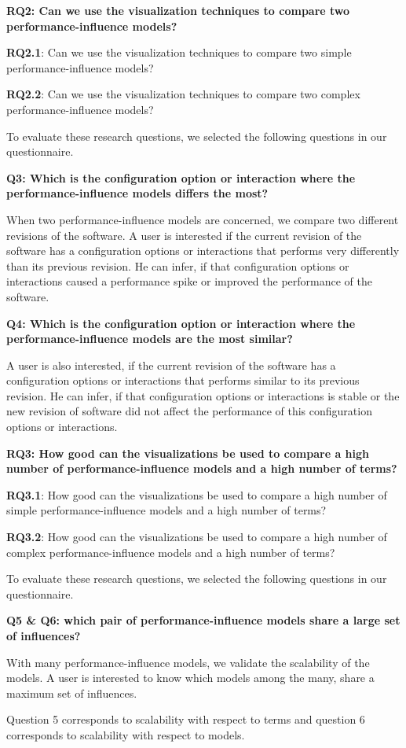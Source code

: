 \textbf{RQ2: Can we use the visualization techniques to compare two performance-influence models?}

\begin{myindentpar}{0.5cm}
\textbf{RQ2.1}: Can we use the visualization techniques to compare two simple performance-influence models?

\textbf{RQ2.2}: Can we use the visualization techniques to compare two complex performance-influence models?

To evaluate these research questions, we selected the following questions in our questionnaire.

\textbf{Q3: Which is the configuration option or interaction where the performance-influence models differs the most?}

When two performance-influence models are concerned, we compare two different revisions of the software. A user is interested if the current revision of the software has a configuration options or interactions that performs very differently than its previous revision. He can infer, if that configuration options or interactions caused a performance spike or improved the performance of the software.

\textbf{Q4: Which is the configuration option or interaction where the performance-influence models are the most similar?}

A user is also interested, if the current revision of the software has a configuration options or interactions that performs similar to its previous revision. He can infer, if that configuration options or interactions is stable or the new revision of software did not affect the performance of this configuration options or interactions.
\end{myindentpar}

\textbf{RQ3: How good can the visualizations be used to compare a high number of performance-influence models and a high number of terms?}

\begin{myindentpar}{0.5cm}

\textbf{RQ3.1}: How good can the visualizations be used to compare a high number of simple performance-influence models and a high number of terms?

\textbf{RQ3.2}: How good can the visualizations be used to compare a high number of complex performance-influence models and a high number of terms?

To evaluate these research questions, we selected the following questions in our questionnaire.

\textbf{Q5 \& Q6: which pair of performance-influence models share a large set of influences?}

With many performance-influence models, we validate the scalability of the models. A user is interested to know which models among the many, share a maximum set of influences. 

Question 5 corresponds to scalability with respect to terms and question 6 corresponds to scalability with respect to models.
\end{myindentpar}


